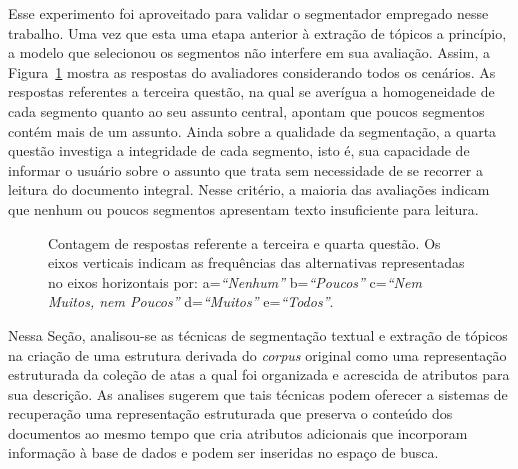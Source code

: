 Esse experimento foi aproveitado para validar o segmentador empregado nesse trabalho. Uma vez que esta uma etapa anterior à extração de tópicos a princípio, a modelo que selecionou os segmentos não interfere em sua avaliação. Assim, a Figura~\ref{fig:Q3e4} mostra as respostas do avaliadores considerando todos os cenários. As respostas referentes a terceira questão, na qual se averígua a homogeneidade de cada segmento quanto ao seu assunto central, apontam que poucos segmentos contém mais de um assunto.
Ainda sobre a qualidade da segmentação, a quarta questão investiga a integridade de cada segmento, isto é, sua capacidade de informar o usuário sobre o assunto que trata sem necessidade de se recorrer a leitura do documento integral. Nesse critério, a maioria das avaliações indicam que nenhum ou poucos segmentos apresentam texto insuficiente para leitura.


\begin{figure}[!h] \centering     %

	\caption{Contagem de respostas referente a terceira e quarta questão. Os eixos verticais indicam as frequências das alternativas representadas no eixos horizontais por:
		a=\textit{``Nenhum''}
		b=\textit{``Poucos''}
		c=\textit{``Nem Muitos, nem Poucos''}
		d=\textit{``Muitos''}
		e=\textit{``Todos''}.
	}
	\label{fig:Q3e4}
\end{figure}





Nessa Seção, analisou-se as técnicas de segmentação textual e extração de tópicos na criação de uma estrutura derivada do \textit{corpus} original como uma representação estruturada da coleção de atas a qual foi organizada e acrescida de atributos para sua descrição. As analises sugerem que tais técnicas podem oferecer a sistemas de recuperação uma representação estruturada que preserva o conteúdo dos documentos ao mesmo tempo que cria atributos adicionais que incorporam informação à base de dados e podem ser inseridas no espaço de busca.  




